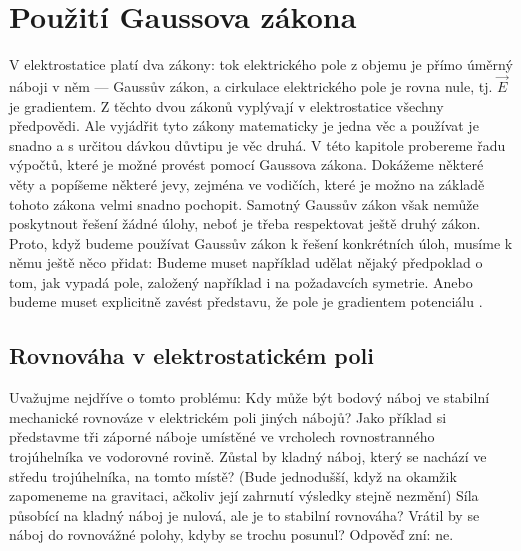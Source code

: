 \chapter{Použití Gaussova zákona}\label{fyz:IIchapV}
\minitoc
V elektrostatice platí dva zákony: tok elektrického pole z objemu je přímo úměrný náboji v něm 
— Gaussův zákon, a cirkulace elektrického pole je rovna nule, tj. \(\vec{E}\) je gradientem. Z 
těchto dvou zákonů vyplývají v elektrostatice všechny předpovědi. Ale vyjádřit tyto zákony 
matematicky je jedna věc a používat je snadno a s určitou dávkou důvtipu je věc druhá. V této 
kapitole probereme řadu výpočtů, které je možné provést pomocí Gaussova zákona. Dokážeme 
některé věty a popíšeme některé jevy, zejména ve vodičích, které je možno na základě tohoto 
zákona velmi snadno pochopit. Samotný Gaussův zákon však nemůže poskytnout řešení žádné úlohy, 
neboť je třeba respektovat ještě druhý zákon. Proto, když budeme používat Gaussův zákon k 
řešení konkrétních úloh, musíme k němu ještě něco přidat: Budeme muset například udělat nějaký 
předpoklad o tom, jak vypadá pole, založený například i na požadavcích symetrie. Anebo 
budeme muset explicitně zavést představu, že pole je gradientem potenciálu 
\cite[s.~82]{Feynman02}.

\section{Rovnováha v elektrostatickém poli}\label{fyz:IIchapVsecI}
  Uvažujme nejdříve o tomto problému: Kdy může být bodový náboj ve stabilní mechanické 
  rovnováze v elektrickém poli jiných nábojů? Jako příklad si představme tři záporné náboje 
  umístěné ve vrcholech rovnostranného trojúhelníka ve vodorovné rovině. Zůstal by kladný 
  náboj, který se nachází ve středu trojúhelníka, na tomto místě? (Bude jednodušší, když na 
  okamžik zapomeneme na gravitaci, ačkoliv její zahrnutí výsledky stejně nezmění) Síla působící 
  na kladný náboj je nulová, ale je to stabilní rovnováha? Vrátil by se náboj do rovnovážné 
  polohy, kdyby se trochu posunul? Odpověď zní: ne.
  
